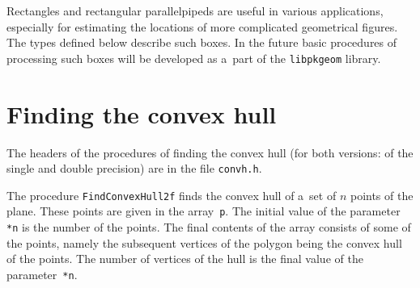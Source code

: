 Rectangles and rectangular parallelpipeds are useful in various applications,
especially for estimating the locations of more complicated geometrical
figures. The types defined below describe such boxes. In the future
basic procedures of processing such boxes will be developed as a~part
of the \texttt{libpkgeom} library.

\vspace{\bigskipamount}


\section{Finding the convex hull}

The headers of the procedures of finding the convex hull
(for both versions: of the single and double precision)
are in the file \texttt{convh.h}.

\vspace{\bigskipamount}
The procedure \texttt{FindConvexHull2f} finds the convex hull of a~set of
$n$ points of the plane.
These points are given in the array~\texttt{p}. The initial value of
the parameter \texttt{*n} is the number of the points.
The final contents of the array consists of some of the points,
namely the subsequent vertices of the polygon being the convex hull
of the points. The number of vertices of the hull is the final value
of the parameter~\texttt{*n}.



